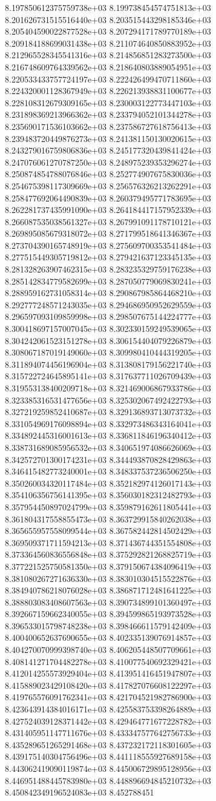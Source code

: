 8.197850612375759738e+03	8.199738454574751813e+03	8.201626731515516440e+03	8.203515443298185346e+03	8.205404590022877528e+03	8.207294171789770189e+03	8.209184188699031438e+03	8.211074640850883952e+03	8.212965528345541316e+03	8.214856851283273500e+03	8.216748609764339562e+03	8.218640803889054951e+03	8.220533433757724197e+03	8.222426499470711860e+03	8.224320001128367949e+03	8.226213938831100677e+03	8.228108312679309165e+03	8.230003122773447103e+03	8.231898369213966362e+03	8.233794052101344278e+03	8.235690171536103662e+03	8.237586727618756413e+03	8.239483720449876273e+03	8.241381150130020615e+03	8.243279016759806836e+03	8.245177320439841424e+03	8.247076061270787250e+03	8.248975239353296274e+03	8.250874854788076846e+03	8.252774907675830036e+03	8.254675398117309669e+03	8.256576326213262291e+03	8.258477692064490839e+03	8.260379495771783695e+03	8.262281737435991090e+03	8.264184417157952339e+03	8.266087535038561327e+03	8.267991091178710121e+03	8.269895085679318072e+03	8.271799518641346367e+03	8.273704390165748919e+03	8.275609700353541484e+03	8.277515449305719812e+03	8.279421637123345135e+03	8.281328263907462315e+03	8.283235329759176238e+03	8.285142834779582699e+03	8.287050779069830241e+03	8.288959162731058314e+03	8.290867985864468210e+03	8.292777248571243035e+03	8.294686950952629559e+03	8.296597093109859998e+03	8.298507675144224777e+03	8.300418697157007045e+03	8.302330159249539065e+03	8.304242061523151278e+03	8.306154404079226879e+03	8.308067187019149060e+03	8.309980410444319205e+03	8.311894074456196904e+03	8.313808179156221740e+03	8.315722724645895141e+03	8.317637711026709439e+03	8.319553138400209718e+03	8.321469006867933786e+03	8.323385316531477656e+03	8.325302067492422793e+03	8.327219259852410687e+03	8.329136893713073732e+03	8.331054969176098894e+03	8.332973486343164041e+03	8.334892445316001613e+03	8.336811846196340412e+03	8.338731689085956532e+03	8.340651974086626069e+03	8.342572701300174231e+03	8.344493870828429863e+03	8.346415482773240001e+03	8.348337537236506250e+03	8.350260034320117484e+03	8.352182974126017143e+03	8.354106356756141395e+03	8.356030182312482793e+03	8.357954450897024799e+03	8.359879162611805441e+03	8.361804317558855473e+03	8.363729915840262038e+03	8.365655957558099544e+03	8.367582442814502429e+03	8.369509371711594213e+03	8.371436744351554808e+03	8.373364560836556848e+03	8.375292821268825719e+03	8.377221525750581350e+03	8.379150674384096419e+03	8.381080267271636330e+03	8.383010304515522876e+03	8.384940786218076028e+03	8.386871712481641225e+03	8.388803083408607563e+03	8.390734899101360497e+03	8.392667159662340055e+03	8.394599865193973528e+03	8.396533015798748238e+03	8.398466611579142409e+03	8.400400652637690655e+03	8.402335139076914857e+03	8.404270070999398740e+03	8.406205448507709661e+03	8.408141271704482278e+03	8.410077540692329421e+03	8.412014255573929404e+03	8.413951416451947807e+03	8.415889023429108420e+03	8.417827076608122297e+03	8.419765576091762341e+03	8.421704521982786900e+03	8.423643914384016171e+03	8.425583753398264889e+03	8.427524039128371442e+03	8.429464771677228782e+03	8.431405951147711676e+03	8.433347577642756733e+03	8.435289651265291468e+03	8.437232172118301605e+03	8.439175140304756496e+03	8.441118555927689158e+03	8.443062419090119874e+03	8.445006729895128956e+03	8.446951488445783980e+03	8.448896694845210732e+03	8.450842349196524083e+03	8.452788451